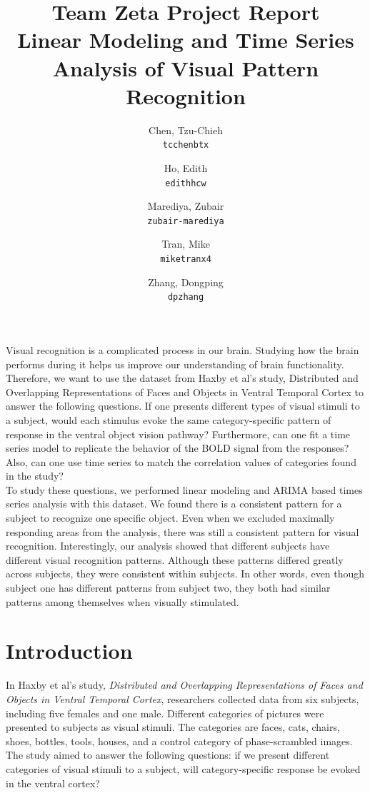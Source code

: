 \documentclass[11pt,twocolumn]{article}
\title{\textbf{Team Zeta Project Report}\\
Linear Modeling and Time Series Analysis of Visual Pattern Recognition}
\author{
  Chen, Tzu-Chieh\\
  \texttt{tcchenbtx}
  \and
  Ho, Edith\\
  \texttt{edithhcw}
  \and
  Marediya, Zubair\\
  \texttt{zubair-marediya}
  \and
  Tran, Mike\\
  \texttt{miketranx4}
  \and
  Zhang, Dongping\\
  \texttt{dpzhang}
}
\begin{document}
\maketitle

\abstract{}
Visual recognition is a complicated process in our brain. 
Studying how the brain performs during it helps us improve our 
understanding of brain functionality. Therefore, we want to use the dataset 
from Haxby et al’s study, Distributed and Overlapping Representations of 
Faces and Objects in Ventral Temporal Cortex to answer the following questions.
If one presents different types of visual stimuli to a subject, would 
each stimulus evoke the same category-specific pattern of response in 
the ventral object vision pathway? Furthermore, can one fit a time series 
model to replicate the behavior of the BOLD signal from the responses? 
Also, can one use time series to match the correlation values of 
categories found in the study? \\

To study these questions, we performed linear modeling and ARIMA based 
times series analysis with this dataset. We found there is a consistent 
pattern for a subject to recognize one specific object. 
Even when we excluded maximally responding areas from the analysis, 
there was still a consistent pattern for visual recognition. Interestingly, 
our analysis showed that different subjects have different visual recognition 
patterns. Although these patterns differed greatly across subjects, 
they were consistent within subjects. In other words, even though subject
one has different patterns from subject two, they both had similar patterns 
among themselves when visually stimulated.\\ 

\section{Introduction}

In Haxby et al's study, \emph{Distributed and Overlapping Representations of 
Faces and Objects in Ventral Temporal Cortex}\cite{objectrec}, researchers
collected data from six subjects, including five females and one male. 
Different categories of pictures were presented to subjects as visual stimuli.
The categories are faces, cats, chairs, shoes, bottles, tools, houses, 
and a control category of phase-scrambled images.
The study aimed to answer the following questions: if we present 
different categories of visual stimuli to a subject, will category-specific 
response be evoked in the ventral cortex? \\
\end{document}
